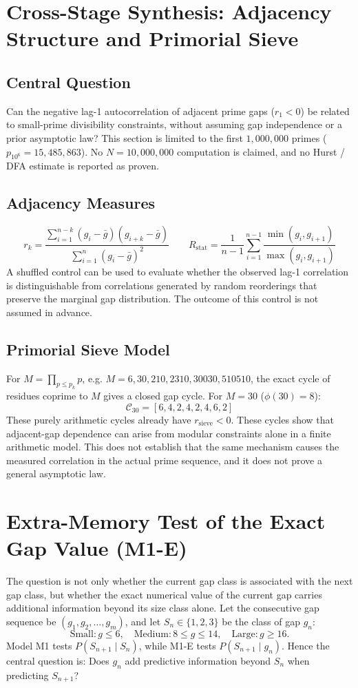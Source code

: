 \documentclass[12pt,a4paper]{article}
\begin{document}
\section{Cross-Stage Synthesis: Adjacency Structure and Primorial Sieve}
\subsection{Central Question}
Can the negative lag-1 autocorrelation of adjacent prime gaps ($r_1 < 0$) be related to small-prime divisibility constraints, without assuming gap independence or a prior asymptotic law? This section is limited to the first $1,000,000$ primes ($p_{10^6} = 15,485,863$). No $N = 10,000,000$ computation is claimed, and no Hurst / DFA estimate is reported as proven.
\subsection{Adjacency Measures}
\[
r_k = \frac{\sum_{i=1}^{n-k} (g_i - \bar{g})(g_{i+k} - \bar{g})}{\sum_{i=1}^{n} (g_i - \bar{g})^2}
\qquad
R_{\text{stat}} = \frac{1}{n-1} \sum_{i=1}^{n-1} \frac{\min(g_i, g_{i+1})}{\max(g_i, g_{i+1})}
\]
A shuffled control can be used to evaluate whether the observed lag-1 correlation is distinguishable from correlations generated by random reorderings that preserve the marginal gap distribution. The outcome of this control is not assumed in advance.
\subsection{Primorial Sieve Model}
For $M = \prod_{p \le p_k} p$, e.g. $M = 6, 30, 210, 2310, 30030, 510510$, the exact cycle of residues coprime to $M$ gives a closed gap cycle. For $M = 30$ ($\phi(30) = 8$):
\[
\mathcal{C}_{30} = [6, 4, 2, 4, 2, 4, 6, 2]
\]
These purely arithmetic cycles already have $r_{\text{sieve}} < 0$. These cycles show that adjacent-gap dependence can arise from modular constraints alone in a finite arithmetic model. This does not establish that the same mechanism causes the measured correlation in the actual prime sequence, and it does not prove a general asymptotic law.
\section{Extra-Memory Test of the Exact Gap Value (M1-E)}
The question is not only whether the current gap class is associated with the next gap class, but whether the exact numerical value of the current gap carries additional information beyond its size class alone.
Let the consecutive gap sequence be $(g_1,g_2,\ldots,g_m)$, and let \(S_n\in\{1,2,3\}\) be the class of gap \(g_n\):
\[
\text{Small}: g\leq6, \quad \text{Medium}: 8\leq g\leq14, \quad \text{Large}: g\geq16.
\]
Model M1 tests $P(S_{n+1}\mid S_n)$, while M1-E tests $P(S_{n+1}\mid g_n)$. Hence the central question is: Does $g_n$ add predictive information beyond $S_n$ when predicting $S_{n+1}$?
\end{document}
